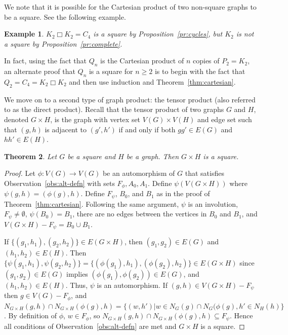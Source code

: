 \documentclass{article}
\newtheorem{theorem}{Theorem}[section]
\newtheorem{example}[theorem]{Example}
\theoremstyle{definition}
\begin{document}
We note that it is possible for the Cartesian product of two non-square graphs to be a square. See the following example.

\begin{example} \rm 
    $K_2 \Box K_2 = C_4$ is a square by Proposition~\ref{pr:cycles}, but $K_2$ is not a square by Proposition~\ref{pr:complete}.
\end{example}

In fact, using the fact that $Q_n$ is the Cartesian product of $n$ copies of $P_2 = K_2$, an alternate proof that $Q_n$ is a square for $n\geq 2$ is to begin with the fact that $Q_2 = C_4 = K_2 \Box K_2$ and then use induction and Theorem~\ref{thm:cartesian}. 

We move on to a second type of graph product: the tensor product (also referred to as the direct product). Recall that the tensor product of two graphs $G$ and $H$, denoted $G \times H$, is the graph with vertex set $V(G) \times V(H)$ and edge set such that $(g,h)$ is adjacent to $(g',h')$ if and only if both $gg' \in E(G)$ and $hh' \in E(H)$. 

\begin{theorem} \label{thm:tensor}
 Let $G$ be a square and $H$ be a graph. Then $G\times H$ is a square.    
\end{theorem}

\begin{proof}
    Let $\phi:V(G)\rightarrow V(G)$ be an automorphism of $G$ that satisfies Observation~\ref{obs:alt-defn} with sets $F_{\phi}, A_0, A_1$. Define $\psi(V(G \times H))$ where $\psi(g,h) = (\phi(g), h)$. Define $F_{\psi}$,  $B_0$, and $B_1$ as in the proof of Theorem~\ref{thm:cartesian}. Following the same argument, $\psi$ is an involution, $F_{\psi} \ne \emptyset$, $\psi(B_0)=B_1$, there are no edges between the vertices in $B_0$ and $B_1$, and $V(G\times H)-F_{\psi}=B_0\cup B_1$.

    If $\{(g_1,h_1), (g_2,h_2)\} \in E(G \times H)$, then $(g_1,g_2) \in E(G)$ and $(h_1,h_2) \in E(H)$. Then $\{\psi(g_1,h_1), \psi(g_2,h_2)\} = \{(\phi(g_1),h_1), (\phi(g_2),h_2)\} \in E(G \times H)$ since $(g_1,g_2) \in E(G)$ implies $(\phi(g_1), \phi(g_2)) \in E(G)$,   and $(h_1,h_2) \in E(H)$. Thus, $\psi$ is an automorphism. If $(g,h) \in V(G \times H) - F_{\psi}$ then $g \in V(G) - F_{\phi}$, and $N_{G\times H}(g,h) \cap N_{G\times H}(\phi(g),h) = \{(w,h') | w \in N_G(g) \cap N_G (\phi(g), h' \in N_H(h) \}$. By definition of $\phi$, $w \in F_{\phi}$, so  $N_{G\times H}(g,h) \cap N_{G\times H}(\phi(g),h) \subseteq F_{\psi}$. Hence all conditions of Observation~\ref{obs:alt-defn} are met and $G\times H$ is a square. 
\end{proof}
\end{document}
